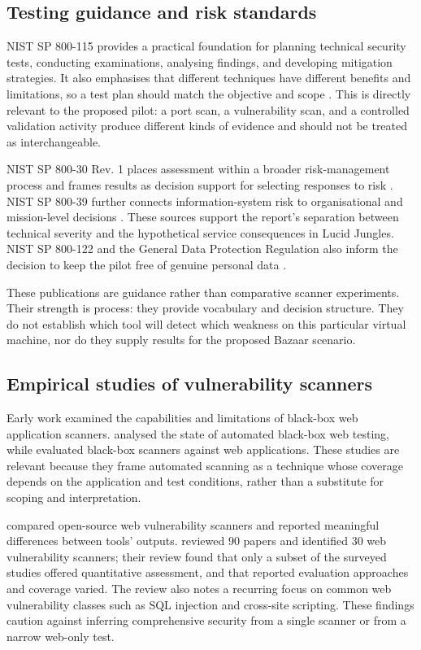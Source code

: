 \documentclass[11pt,a4paper]{article}
\begin{document}
\subsection{Testing guidance and risk standards}
NIST SP 800-115 provides a practical foundation for planning technical security tests, conducting examinations, analysing findings, and developing mitigation strategies. It also emphasises that different techniques have different benefits and limitations, so a test plan should match the objective and scope \citep{scarfone2008}. This is directly relevant to the proposed pilot: a port scan, a vulnerability scan, and a controlled validation activity produce different kinds of evidence and should not be treated as interchangeable.

NIST SP 800-30 Rev. 1 places assessment within a broader risk-management process and frames results as decision support for selecting responses to risk \citep{jointtaskforce2012}. NIST SP 800-39 further connects information-system risk to organisational and mission-level decisions \citep{jointtaskforce2011}. These sources support the report's separation between technical severity and the hypothetical service consequences in Lucid Jungles. NIST SP 800-122 and the General Data Protection Regulation also inform the decision to keep the pilot free of genuine personal data \citep{mccallister2010,eu2016gdpr}.

These publications are guidance rather than comparative scanner experiments. Their strength is process: they provide vocabulary and decision structure. They do not establish which tool will detect which weakness on this particular virtual machine, nor do they supply results for the proposed Bazaar scenario.

\subsection{Empirical studies of vulnerability scanners}
Early work examined the capabilities and limitations of black-box web application scanners. \citet{bau2010} analysed the state of automated black-box web testing, while \citet{doupe2010} evaluated black-box scanners against web applications. These studies are relevant because they frame automated scanning as a technique whose coverage depends on the application and test conditions, rather than a substitute for scoping and interpretation.

\citet{alsaleh2017} compared open-source web vulnerability scanners and reported meaningful differences between tools' outputs. \citet{alazmi2022} reviewed 90 papers and identified 30 web vulnerability scanners; their review found that only a subset of the surveyed studies offered quantitative assessment, and that reported evaluation approaches and coverage varied. The review also notes a recurring focus on common web vulnerability classes such as SQL injection and cross-site scripting. These findings caution against inferring comprehensive security from a single scanner or from a narrow web-only test.
\end{document}
